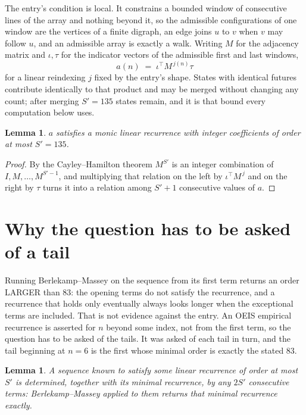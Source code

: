 \documentclass[11pt,a4paper]{article}
\theoremstyle{plain}
\newtheorem{lemma}[theorem]{Lemma}
\theoremstyle{definition}
\begin{document}
The entry's condition is local. It constrains a bounded window of consecutive lines of the
array and nothing beyond it, so the admissible configurations of one window are the vertices of
a finite digraph, an edge joins $u$ to $v$ when $v$ may follow $u$, and an admissible array is
exactly a walk. Writing $M$ for the adjacency matrix and $\iota,\tau$ for the indicator vectors
of the admissible first and last windows,
\[
a(n)\;=\;\iota^{\!\top}M^{\,j(n)}\tau
\]
for a linear reindexing $j$ fixed by the entry's shape. States with identical futures
contribute identically to that product and may be merged without changing any count; after
merging $S'=135$ states remain, and it is that bound every computation below uses.

\begin{lemma}\label{lem:cf}
$a$ satisfies a monic linear recurrence with integer coefficients of order at most $S'=135$.
\end{lemma}

\begin{proof}
By the Cayley--Hamilton theorem $M^{S'}$ is an integer combination of $I,M,\dots,M^{S'-1}$,
and multiplying that relation on the left by $\iota^{\!\top}M^{\,j}$ and on the right by
$\tau$ turns it into a relation among $S'+1$ consecutive values of $a$.
\end{proof}

\section{Why the question has to be asked of a tail}

Running Berlekamp--Massey on the sequence from its first term returns an order LARGER than $83$: the opening terms do not satisfy the recurrence, and a recurrence that holds only eventually always looks longer when the exceptional terms are included. That is not evidence against the entry. An OEIS empirical recurrence is asserted for $n$ beyond some index, not from the first term, so the question has to be asked of the tails. It was asked of each tail in turn, and the tail beginning at $n=6$ is the first whose minimal order is exactly the stated $83$.

\begin{lemma}\label{lem:bm}
A sequence known to satisfy some linear recurrence of order at most $S'$ is determined,
together with its minimal recurrence, by any $2S'$ consecutive terms: Berlekamp--Massey applied
to them returns that minimal recurrence exactly.
\end{lemma}
\end{document}
